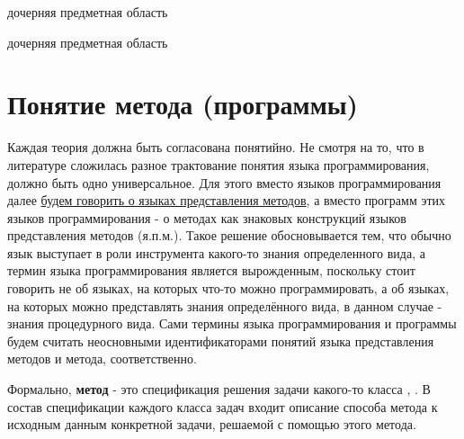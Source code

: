 \begin{SCn}
\begin{scnrelfromlist}{дочерняя предметная область}
    \begin{scnindent}
        \begin{scnrelfromlist}{дочерняя предметная область}
        \end{scnrelfromlist}
    \end{scnindent}
\end{scnrelfromlist}
\end{SCn}

\section{Понятие метода (программы)}

Каждая теория должна быть согласована понятийно. Не смотря на то, что в литературе сложилась разное трактование понятия языка программирования, должно быть одно универсальное. Для этого вместо языков программирования далее \underline{будем говорить о языках представления методов}, а вместо программ этих языков программирования - о методах как знаковых конструкций языков представления методов (я.п.м.). Такое решение обосновывается тем, что обычно язык выступает в роли инструмента какого-то знания определенного вида, а термин языка программирования является вырожденным, поскольку стоит говорить не об языках, на которых что-то можно программировать, а об языках, на которых можно представлять знания определённого вида, в данном случае - знания процедурного вида. Сами термины языка программирования и программы будем считать неосновными идентификаторами понятий языка представления методов и метода, соответственно.

Формально, \textbf{метод} - это спецификация решения задачи какого-то класса \cite{Standard2021}, \cite{Tuzov1986}. В состав спецификации каждого класса задач входит описание способа  метода к исходным данным конкретной задачи, решаемой с помощью этого метода.

\begin{SCn}
\end{SCn}

